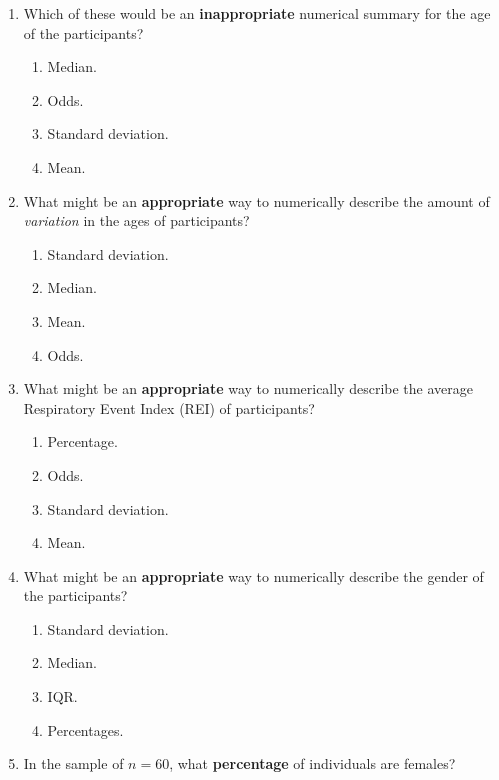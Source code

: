 \documentclass[
  11pt,
  a4paper,
  krantz2]{krantz}
\providecommand{\tightlist}{%
  \setlength{\itemsep}{0pt}\setlength{\parskip}{0pt}}
\begin{document}
\begin{enumerate}
\def\labelenumi{\arabic{enumi}.}
\tightlist
\item
  Which of these would be an \textbf{inappropriate} numerical summary for the age of the participants? \tightlist  

  \begin{enumerate}
  \def\labelenumii{\alph{enumii}.}
  \tightlist
  \item
    Median.
  \item
    Odds.
  \item
    Standard deviation.
  \item
    Mean.
  \end{enumerate}
\item
  What might be an \textbf{appropriate} way to numerically describe the amount of \emph{variation} in the ages of participants?

  \begin{enumerate}
  \def\labelenumii{\alph{enumii}.}
  \tightlist
  \item
    Standard deviation.
  \item
    Median.
  \item
    Mean.
  \item
    Odds.
  \end{enumerate}
\item
  What might be an \textbf{appropriate} way to numerically describe the average Respiratory Event Index (REI) of participants?

  \begin{enumerate}
  \def\labelenumii{\alph{enumii}.}
  \tightlist
  \item
    Percentage.
  \item
    Odds.
  \item
    Standard deviation.
  \item
    Mean.
  \end{enumerate}
\item
  What might be an \textbf{appropriate} way to numerically describe the gender of the participants?

  \begin{enumerate}
  \def\labelenumii{\alph{enumii}.}
  \tightlist
  \item
    Standard deviation.
  \item
    Median.
  \item
    IQR.
  \item
    Percentages.
  \end{enumerate}
\item
  In the sample of \(n = 60\), what \textbf{percentage} of individuals are females?


\end{enumerate}
\end{document}
